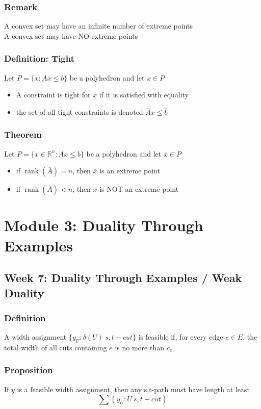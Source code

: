\documentclass[11pt]{article}
\newcommand{\R}{{\mathbb{R}}}
\newcommand{\rank}{\operatorname{rank}}
\begin{document}
\subsubsection*{Remark}
A convex set may have an infinite number of extreme points \\
A convex set may have NO extreme points 
\subsubsection{Definition: Tight}
Let $P=\{x:Ax\leq b\}$ be a polyhedron and let $x\in P$
\begin{itemize}
  \item A constraint is tight for $x$ if it is satisfied with equality 
  \item the set of all tight constraints is denoted $\overline{A}x\leq\overline{b}$
\end{itemize}
\subsubsection{Theorem}
Let $P=\{x\in\R^n:Ax\leq b\}$ be a polyhedron and let $\overline{x}\in P$
\begin{itemize}
  \item if $\rank(\overline{A})=n$, then $\overline{x}$ is an extreme point 
  \item if $\rank(\overline{A})<n$, then $\overline{x}$ is NOT an extreme point 
\end{itemize}

\section{Module 3: Duality Through Examples}
\subsection{Week 7: Duality Through Examples / Weak Duality}
\subsubsection{Definition}
A width assignment $\{y_U:\delta(U)\ s,t-cut\}$ is feasible if, for every edge $e\in E$, the total width of all cuts containing $e$ is no more than $c_e$
\subsubsection{Proposition}
If $y$ is a feasible width assignment, then any s,t-path must have length at least \[\sum(y_U:U\ s,t-cut)\]
\end{document}

